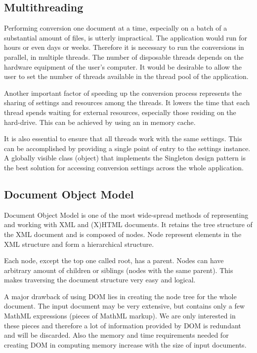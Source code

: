 \documentclass[11pt,oneside,final]{fithesis2}
\begin{document}
\subsection{Multithreading}
Performing conversion one document at a time, especially on a batch of a substantial amount of files, is utterly impractical. The application would run for hours or even days or weeks. Therefore it is necessary to run the conversions in parallel, in multiple threads. The number of disposable threads depends on the hardware equipment of the user's computer. It would be desirable to allow the user to set the number of threads available in the thread pool of the application.

Another important factor of speeding up the conversion process represents the sharing of settings and resources among the threads. It lowers the time that each thread spends waiting for external resources, especially those residing on the hard-drive. This can be achieved by using an in memory cache.

It is also essential to ensure that all threads work with the same settings. This can be accomplished by providing a single point of entry to the settings instance. A globally visible class (object) that implements the Singleton design pattern is the best solution for accessing conversion settings across the whole application.

\subsection{Document Object Model}
Document Object Model is one of the most wide-spread methods of representing and working with XML and (X)HTML documents. It retains the tree structure of the XML document and is composed of nodes. Node represent elements in the XML structure and form a hierarchical structure. 

Each node, except the top one called root, has a parent. Nodes can have arbitrary amount of children or siblings (nodes with the same parent). This makes traversing the document structure very easy and logical. 

A major drawback of using DOM lies in creating the node tree for the whole document. The input document may be very extensive, but contains only a few MathML expressions (pieces of MathML markup). We are only interested in these pieces and therefore a lot of information provided by DOM is redundant and will be discarded. Also the memory and time requirements needed for creating DOM in computing memory increase with the size of input documents.
\end{document}
